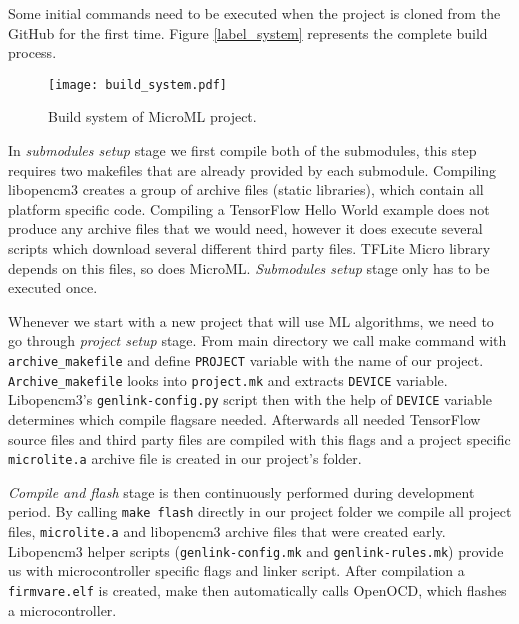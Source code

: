 Some initial commands need to be executed when the project is cloned from the GitHub for the first time. 
Figure \ref{label_system} represents the complete build process.

\begin{figure}[ht]
        \centering
        \texttt{[image: build\_system.pdf]} 
        \caption{ Build system of MicroML project.} 
        \label{build_system}
\end{figure}

In \textit{submodules setup} stage we first compile both of the submodules, this step requires two makefiles that are already provided by each submodule.
Compiling libopencm3 creates a group of archive files (static libraries), which contain all platform specific code.
Compiling a TensorFlow Hello World example does not produce any archive files that we would need, however it does execute several scripts which download several different third party files.
TFLite Micro library depends on this files, so does MicroML.
\textit{Submodules setup} stage only has to be executed once.

Whenever we start with a new project that will use ML algorithms, we need to go through \textit{project setup} stage.
From main directory we call make command with \verb|archive_makefile| and define \verb|PROJECT| variable with the name of our project.
\verb|Archive_makefile| looks into \verb|project.mk| and extracts \verb|DEVICE| variable.
Libopencm3's \verb|genlink-config.py| script then with the help of \verb|DEVICE| variable determines which compile flags\footnotemark are needed. 
Afterwards all needed TensorFlow source files and third party files are compiled with this flags and a project specific \verb|microlite.a| archive file is created in our project's folder.


\textit{Compile and flash} stage is then continuously performed during development period.
By calling \verb|make flash| directly in our project folder we compile all project files, \verb|microlite.a| and libopencm3 archive files that were created early.
Libopencm3 helper scripts (\verb|genlink-config.mk| and \verb|genlink-rules.mk|) provide us with microcontroller specific flags and linker script.
After compilation a \verb|firmvare.elf| is created, make then automatically calls OpenOCD, which flashes a microcontroller.

